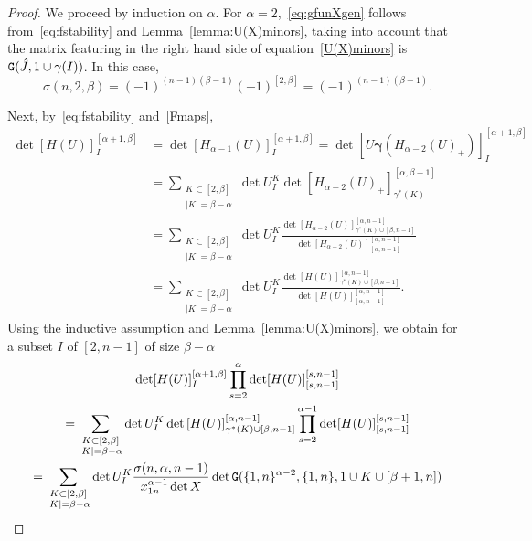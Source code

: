 \documentclass{amsart}
\theoremstyle{definition}
\theoremstyle{remark}
\numberwithin{equation}{section}
\numberwithin{theorem}{section}
\def\NG{{\tt G}}
\def\bgamma{\pmb\gamma}
\begin{document}
\begin{proof} We proceed by induction on $\alpha$. For $\alpha=2$,~\eqref{eq:gfunXgen} follows from~\eqref{eq:fstability} and Lemma~\ref{lemma:U(X)minors}, taking into account that the matrix featuring in the right hand side of equation~\eqref{U(X)minors} is $\NG(\hat J,1\cup\gamma(I))$. In this case, 
\begin{equation}\label{sigmainit}
\sigma(n,2,\beta)=(-1)^{(n-1)(\beta -1)} (-1)^{[2,\beta]} =(-1)^{(n-1)(\beta-1)}. 
\end{equation}

Next, by~\eqref{eq:fstability} and~\eqref{Fmaps},
\[ 
\begin{aligned}
\det [H(U)]_{I}^{[\alpha+1,\beta]}&=\det [H_{\alpha-1}(U)]_{I}^{[\alpha+1,\beta]}
=\det \left [ U\bgamma(H_{\alpha-2}(U)_+)\right ]_{I}^{[\alpha+1,\beta]}\\ 
&= \sum_{\substack{K \subset [2,\beta]\\ |K| = \beta -\alpha}}\det U_I^K  \det \left [H_{\alpha-2}(U)_+\right ]_{\gamma^*(K)}^{[\alpha,\beta-1]}\\
&= \sum_{\substack{K \subset [2,\beta]\\ |K| = \beta -\alpha}}\det U_I^K  \frac{\det \left [H_{\alpha-2}(U)\right ]_{\gamma^*(K)\cup [\beta,n-1]}^{[\alpha,n-1]}}
{\det \left [H_{\alpha-2}(U)\right ]_{[\alpha,n-1]}^{[\alpha,n-1]}}\\
&= \sum_{\substack{K \subset [2,\beta]\\ |K| = \beta -\alpha}}\det U_I^K  \frac{\det \left [H(U)\right ]_{\gamma^*(K)\cup [\beta,n-1]}^{[\alpha,n-1]}}
{\det \left [H(U)\right ]_{[\alpha,n-1]}^{[\alpha,n-1]}}.
\end{aligned}
\]
Using the inductive assumption and Lemma~\ref{lemma:U(X)minors}, we obtain for a subset $I$ of $[2,n-1]$ of size $\beta-\alpha$
\begin{multline}\label{eq:gfunXderive}
\det [H(U)]_{I}^{[\alpha+1,\beta]}\prod_{s=2}^{\alpha}\det [H(U)]_{[s,n-1]}^{[s,n-1]} \\ 
=\sum_{\substack{K \subset [2,\beta]\\ |K| = \beta -\alpha}}\det U_I^K \det \left [H(U)\right ]_{\gamma^*(K)\cup [\beta,n-1]}^{[\alpha,n-1]}\prod_{s=2}^{\alpha-1}\det [H(U)]_{[s,n-1]}^{[s,n-1]}\\
= \sum_{\substack{K \subset [2,\beta]\\ |K| = \beta -\alpha}}\det U_I^K \frac{\sigma(n,\alpha,n-1)}{x_{1n}^{\alpha-1}\det X}
\det\NG(\{1,n\}^{\alpha-2},\{1,n\},1\cup K\cup[\beta +1, n])\\

\end{multline}
\end{proof}
\end{document}
